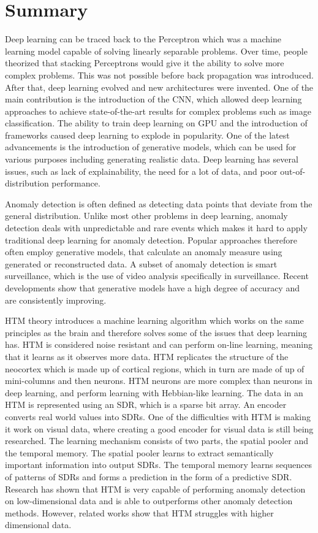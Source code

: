 \section{Summary}
Deep learning can be traced back to the Perceptron which was a machine learning model capable of solving linearly separable problems. Over time, people theorized that stacking Perceptrons would give it the ability to solve more complex problems. This was not possible before back propagation was introduced. After that, deep learning evolved and new architectures were invented. One of the main contribution is the introduction of the CNN, which allowed deep learning approaches to achieve state-of-the-art results for complex problems such as image classification. The ability to train deep learning on GPU and the introduction of frameworks caused deep learning to explode in popularity. One of the latest advancements is the introduction of generative models, which can be used for various purposes including generating realistic data. Deep learning has several issues, such as lack of explainability, the need for a lot of data, and poor out-of-distribution performance.
\par
Anomaly detection is often defined as detecting data points that deviate from the general distribution. Unlike most other problems in deep learning, anomaly detection deals with unpredictable and rare events which makes it hard to apply traditional deep learning for anomaly detection. Popular approaches therefore often employ generative models, that calculate an anomaly measure using generated or reconstructed data. A subset of anomaly detection is smart surveillance, which is the use of video analysis specifically in surveillance. Recent developments show that generative models have a high degree of accuracy and are consistently improving.
\par
HTM theory introduces a machine learning algorithm which works on the same principles as the brain and therefore solves some of the issues that deep learning has. HTM is considered noise resistant and can perform on-line learning, meaning that it learns as it observes more data. HTM replicates the structure of the neocortex which is made up of cortical regions, which in turn are made of up of mini-columns and then neurons. HTM neurons are more complex than neurons in deep learning, and perform learning with Hebbian-like learning. The data in an HTM is represented using an SDR, which is a sparse bit array. An encoder converts real world values into SDRs. One of the difficulties with HTM is making it work on visual data, where creating a good encoder for visual data is still being researched. The learning mechanism consists of two parts, the spatial pooler and the temporal memory. The spatial pooler learns to extract semantically important information into output SDRs. The temporal memory learns sequences of patterns of SDRs and forms a prediction in the form of a predictive SDR. Research has shown that HTM is very capable of performing anomaly detection on low-dimensional data and is able to outperforms other anomaly detection methods. However, related works show that HTM struggles with higher dimensional data.